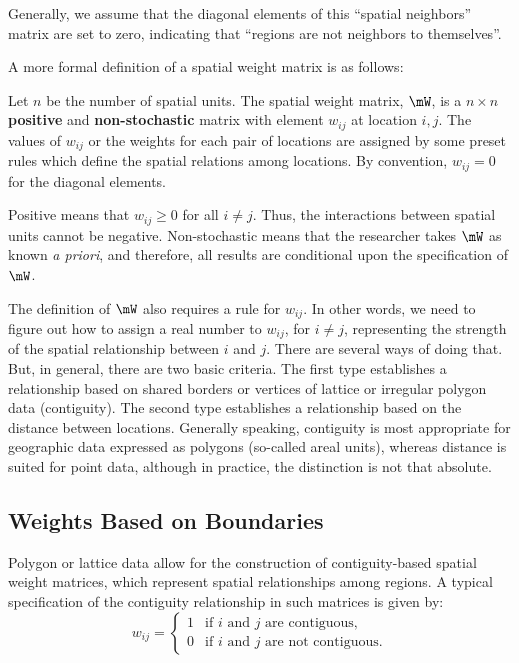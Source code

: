 Generally, we assume that the diagonal elements of this ``spatial neighbors'' matrix are set to zero, indicating that ``regions are not neighbors to themselves''.

A more formal definition of a spatial weight matrix is as follows:

\begin{definition}\label{def:W}
  Let $n$ be the number of spatial units. The spatial weight matrix, $\mW$, is a $n\times n$ \textbf{positive} and \textbf{non-stochastic} matrix with element $w_{ij}$ at location $i,j$. The values of $w_{ij}$ or the weights for each pair of locations are assigned by some preset rules which define the spatial relations among locations. By convention, $w_{ij} = 0$ for the diagonal elements.
\end{definition}

Positive means that $w_{ij}\geq 0$ for all $i\neq j$. Thus, the interactions between spatial units cannot be negative. Non-stochastic means that the researcher takes $\mW$ as known \emph{a priori}, and therefore, all results are conditional upon the specification of $\mW$.

The definition of $\mW$ also requires a rule for $w_{ij}$. In other words, we need to figure out how to assign a real number to $w_{ij}$, for $i\neq j$, representing the strength of the spatial relationship between $i$ and $j$. There are several ways of doing that. But, in general, there are two basic criteria. The first type establishes a relationship based on shared borders or vertices of lattice or irregular polygon data (contiguity). The second type establishes a relationship based on the distance between locations. Generally speaking, contiguity is most appropriate for geographic data expressed as polygons (so-called areal units), whereas distance is suited for point data, although in practice, the distinction is not that absolute. 

\subsection{Weights Based on Boundaries}

Polygon or lattice data allow for the construction of contiguity-based spatial weight matrices, which represent spatial relationships among regions. A typical specification of the contiguity relationship in such matrices is given by:
\begin{equation*}
  w_{ij}= 
   \begin{cases}
      1 & \mbox{if $i$ and $j$ are contiguous,} \\ 
      0 & \mbox{if $i$ and $j$ are not contiguous.} 
   \end{cases}
\end{equation*}


